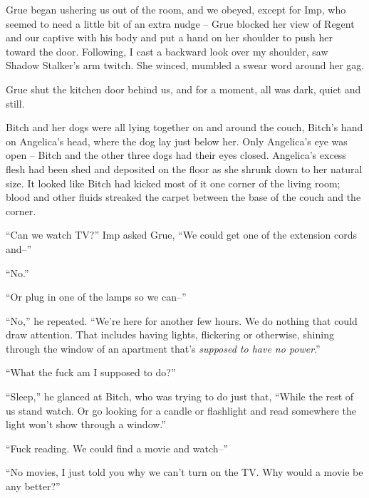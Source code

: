 Grue began ushering us out of the room, and we obeyed, except for Imp, who seemed to need a little bit of an extra nudge – Grue blocked her view of Regent and our captive with his body and put a hand on her shoulder to push her toward the door.  Following, I cast a backward look over my shoulder, saw Shadow Stalker's arm twitch.  She winced, mumbled a swear word around her gag.



Grue shut the kitchen door behind us, and for a moment, all was dark, quiet and still.



Bitch and her dogs were all lying together on and around the couch, Bitch's hand on Angelica's head, where the dog lay just below her.  Only Angelica's eye was open – Bitch and the other three dogs had their eyes closed.  Angelica's excess flesh had been shed and deposited on the floor as she shrunk down to her natural size.  It looked like Bitch had kicked most of it one corner of the living room; blood and other fluids streaked the carpet between the base of the couch and the corner.



``Can we watch TV?'' Imp asked Grue, ``We could get one of the extension cords and--''



``No.''



``Or plug in one of the lamps so we can--''



``No,'' he repeated.  ``We're here for another few hours.  We do nothing that could draw attention.  That includes having lights, flickering or otherwise, shining through the window of an apartment that's \emph{supposed to have no power}.''



``What the fuck am I supposed to do?''



``Sleep,'' he glanced at Bitch, who was trying to do just that, ``While the rest of us stand watch.  Or go looking for a candle or flashlight and read somewhere the light won't show through a window.''



``Fuck reading.  We could find a movie and watch--''



``No movies, I just told you why we can't turn on the TV.  Why would a movie be any better?''



